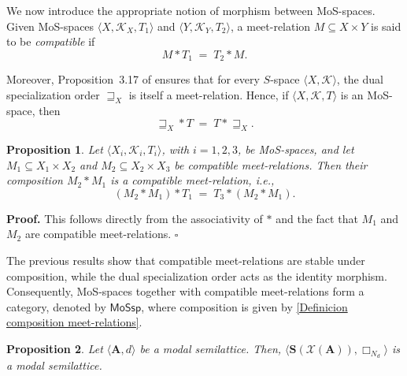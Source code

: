 \documentclass{article}
\newtheorem{proposition}{\bf Proposition}[section]
\newenvironment{proof}
{\par\noindent\textbf{Proof. }\rm}
{\hfill$\boldsymbol{\square}$\par\vspace{0.3cm}}
\begin{document}
We now introduce the appropriate notion of morphism between MoS-spaces. Given MoS-spaces $\langle X,\mathcal{K}_X,T_1 \rangle$ and $\langle Y,\mathcal{K}_Y,T_2 \rangle$, a meet-relation $M \subseteq X \times Y$ is said to be \emph{compatible} if
\[
M * T_1 \;=\; T_2 * M.
\]

Moreover, Proposition~3.17 of \cite{CG} ensures that for every $S$-space $\langle X, \mathcal{K}\rangle$, the dual specialization order $\sqsupseteq_X$ is itself a meet-relation. Hence, if $\langle X, \mathcal{K}, T\rangle$ is an MoS-space, then
\[
\sqsupseteq_X * T \;=\; T * \sqsupseteq_X.
\]

\begin{proposition}
 Let $\langle X_{i},\mathcal{K}_{i},T_{i}\rangle$, with $i=1,2,3$, be MoS-spaces, and let $M_{1} \subseteq X_{1} \times X_{2}$ and $M_{2} \subseteq X_{2} \times X_{3}$ be compatible meet-relations. Then their composition $M_{2} * M_{1}$ is a compatible meet-relation, i.e.,
\[
(M_{2} * M_{1}) * T_{1} \;=\; T_{3} * (M_{2} * M_{1}).
\]
\end{proposition}

\begin{proof}
This follows directly from the associativity of $*$ and the fact that $M_1$ and $M_2$ are compatible meet-relations.
\end{proof}

The previous results show that compatible meet-relations are stable under composition, while the dual specialization order acts as the identity morphism. Consequently, MoS-spaces together with compatible meet-relations form a category, denoted by $\mathsf{MoSsp}$, where composition is given by \eqref{Definicion composition meet-relations}.

\begin{proposition}\label{S(X(A)) es modal}
    Let $\langle \mathbf{A}, d \rangle$ be a modal semilattice. Then, $\langle \mathbf{S}(\mathcal{X}(\mathbf{A})), \Box_{N_d} \rangle$ is a modal semilattice.
\end{proposition}
\end{document}
